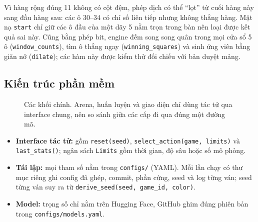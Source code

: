 \documentclass[12pt,a4paper]{report}
\newenvironment{gon}{\begin{itemize}\setlength{\itemsep}{2pt}\setlength{\parskip}{0pt}}{\end{itemize}}
\begin{document}
Vì hàng rộng đúng 11 không có cột đệm, phép dịch có thể ``lọt'' từ cuối hàng này sang đầu hàng sau: các ô 30--34 có chỉ số liên tiếp nhưng không thẳng hàng. Mặt nạ \texttt{start} chỉ giữ các ô đầu của một dãy 5 nằm trọn trong bàn nên loại được kết quả sai này. Cũng bằng phép bit, engine đếm song song quân trong mọi cửa sổ 5 ô (\texttt{window\_counts}), tìm ô thắng ngay (\texttt{winning\_squares}) và sinh ứng viên bằng giãn nở (\texttt{dilate}); các hàm này được kiểm thử đối chiếu với bản duyệt mảng.

\subsection{Kiến trúc phần mềm}
\begin{figure}[H]
  \centering
  \caption{Các khối chính. Arena, huấn luyện và giao diện chỉ dùng tác tử qua interface chung, nên so sánh giữa các cấp đi qua đúng một đường mã.}
  \label{fig:kientruc}
\end{figure}
\begin{gon}
  \item \textbf{Interface tác tử:} gồm \texttt{reset(seed)}, \texttt{select\_action(game, limits)} và \texttt{last\_stats()}; ngân sách \texttt{Limits} gồm thời gian, độ sâu hoặc số mô phỏng.
  \item \textbf{Tái lập:} mọi tham số nằm trong \texttt{configs/} (YAML). Mỗi lần chạy có thư mục riêng ghi config đã ghép, commit, phần cứng, seed và log từng ván; seed từng ván suy ra từ \texttt{derive\_seed(seed, game\_id, color)}.
  \item \textbf{Model:} trọng số chỉ nằm trên Hugging Face, GitHub ghim đúng phiên bản trong \texttt{configs/models.yaml}.
\end{gon}
\end{document}
